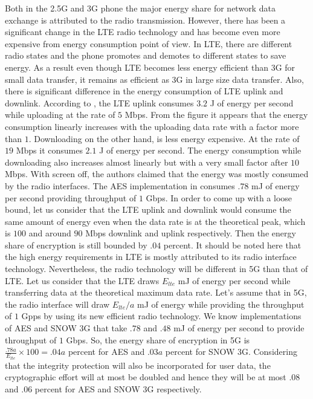 \documentclass[lnicst,sechang,a4paper]{svmultln}
\begin{document}
Both in the 2.5G and 3G phone the major energy share for network data exchange is attributed to the radio transmission. However, there has been a significant change in the LTE radio technology and has become even more expensive from energy consumption point of view. In LTE, there are different radio states and the phone promotes and demotes to different states to save energy. As a result even though LTE becomes less energy efficient than 3G for small data transfer, it remains as efficient as 3G in large size data transfer. Also, there is significant difference in the energy consumption of LTE uplink and downlink. According to \cite[Fig 9]{Mobisys_2012}, the LTE uplink consumes $3.2$ J of energy per second while uploading at the rate of $5$ Mbps. From the figure it appears that the energy consumption linearly increases with the uploading data rate with a factor more than $1$. Downloading on the other hand, is less energy expensive. At the rate of $19$ Mbps it consumes $2.1$ J of energy per second. The energy consumption while downloading also increases almost linearly but with a very small factor after $10$ Mbps. With screen off, the authors claimed that the energy was mostly consumed by the radio interfaces. The AES implementation in \cite{Ruhr_2011} consumes $.78$ mJ of energy per second providing throughput of $1$ Gbps. In order to come up with a loose bound, let us consider that the LTE uplink and downlink would consume the same amount of energy even when the data rate is at the theoretical peak, which is $100$ and around $90$ Mbps downlink and uplink respectively. Then the energy share of encryption is still bounded by $.04$ percent. It should be noted here that the high energy requirements in LTE is mostly attributed to its radio interface technology. Nevertheless, the radio technology will be different in 5G than that of LTE. Let us consider that the LTE draws $E_{lte}$ mJ of energy per second while transferring data at the theoretical maximum data rate. Let's assume that in 5G, the radio interface will draw $E_{lte}/a$ mJ of energy while providing the throughput of $1$ Gpps by using its new efficient radio technology. We know implementations of AES and SNOW 3G that take $.78$ and $.48$ mJ of energy per second to provide throughput of $1$ Gbps. So, the energy share of encryption in 5G is $\frac{.78a}{E_{lte}}\times 100 = .04a$ percent for AES and $.03a$ percent for SNOW 3G. Considering that the integrity protection will also be incorporated for user data, the cryptographic effort will at most be doubled and hence they will be at most $.08$ and $.06$ percent for AES and SNOW 3G respectively.
\end{document}
